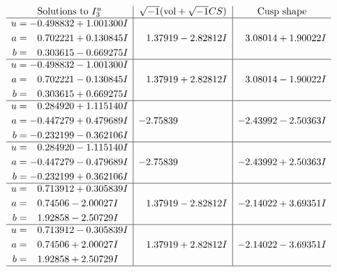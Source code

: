 \documentclass[1p]{elsarticle_modified}
\theoremstyle{definition}
\newcommand{\I}{\sqrt{-1}}
\begin{document}
$$\begin{array}{c|c|c}  
\text{Solutions to }I^u_{3}& \I (\text{vol} + \sqrt{-1}CS) & \text{Cusp shape}\\
 \hline 
\begin{aligned}
u &= -0.498832 + 1.001300 I \\
a &= \phantom{-}0.702221 + 0.130845 I \\
b &= \phantom{-}0.303615 - 0.669275 I\end{aligned}
 & \phantom{-}1.37919 - 2.82812 I & \phantom{-}3.08014 + 1.90022 I \\ \hline\begin{aligned}
u &= -0.498832 - 1.001300 I \\
a &= \phantom{-}0.702221 - 0.130845 I \\
b &= \phantom{-}0.303615 + 0.669275 I\end{aligned}
 & \phantom{-}1.37919 + 2.82812 I & \phantom{-}3.08014 - 1.90022 I \\ \hline\begin{aligned}
u &= \phantom{-}0.284920 + 1.115140 I \\
a &= -0.447279 + 0.479689 I \\
b &= -0.232199 - 0.362106 I\end{aligned}
 & -2.75839\phantom{ +0.000000I} & -2.43992 - 2.50363 I \\ \hline\begin{aligned}
u &= \phantom{-}0.284920 - 1.115140 I \\
a &= -0.447279 - 0.479689 I \\
b &= -0.232199 + 0.362106 I\end{aligned}
 & -2.75839\phantom{ +0.000000I} & -2.43992 + 2.50363 I \\ \hline\begin{aligned}
u &= \phantom{-}0.713912 + 0.305839 I \\
a &= \phantom{-}0.74506 - 2.00027 I \\
b &= \phantom{-}1.92858 - 2.50729 I\end{aligned}
 & \phantom{-}1.37919 - 2.82812 I & -2.14022 + 3.69351 I \\ \hline\begin{aligned}
u &= \phantom{-}0.713912 - 0.305839 I \\
a &= \phantom{-}0.74506 + 2.00027 I \\
b &= \phantom{-}1.92858 + 2.50729 I\end{aligned}
 & \phantom{-}1.37919 + 2.82812 I & -2.14022 - 3.69351 I\\
 \hline 
 \end{array}$$\newpage\newpage\renewcommand{\arraystretch}{1}
\end{document}
